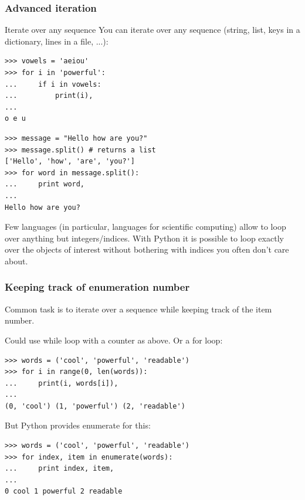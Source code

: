 \documentclass[colorlinks]{beamer}
\begin{document}
\begin{frame}[fragile]\frametitle{Advanced iteration}
\begin{block}{Iterate over any sequence}
\tiny
You can iterate over any sequence (string, list, keys in a dictionary, lines in a file, ...):
\tiny
\begin{verbatim}
>>> vowels = 'aeiou'
>>> for i in 'powerful':
...     if i in vowels:
...         print(i),
... 
o e u\end{verbatim}

\begin{verbatim}
>>> message = "Hello how are you?"
>>> message.split() # returns a list
['Hello', 'how', 'are', 'you?']
>>> for word in message.split():
...     print word,
... 
Hello how are you?\end{verbatim}

Few languages (in particular, languages for scientific computing) allow to loop over anything but integers/indices. With Python it is possible to loop exactly over the objects of interest without bothering with indices you often don’t care about.
\end{block}

\end{frame}


\begin{frame}[fragile]\frametitle{Keeping track of enumeration number}
Common task is to iterate over a sequence while keeping track of the item number.
\begin{block}{Could use while loop with a counter as above. Or a for loop:}
\tiny
\begin{verbatim}
>>> words = ('cool', 'powerful', 'readable')
>>> for i in range(0, len(words)):
...     print(i, words[i]),
... 
(0, 'cool') (1, 'powerful') (2, 'readable')\end{verbatim}

\end{block}
\begin{block}{But Python provides enumerate for this:}
\tiny
\begin{verbatim}
>>> words = ('cool', 'powerful', 'readable')
>>> for index, item in enumerate(words):
...     print index, item,
... 
0 cool 1 powerful 2 readable\end{verbatim}

\end{block}
\end{frame}
\end{document}
